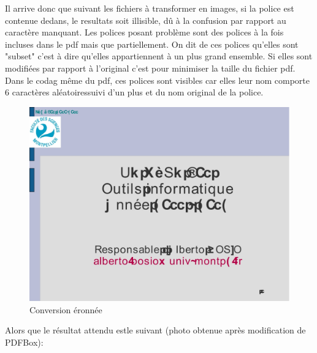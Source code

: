 Il arrive donc que suivant les fichiers à transformer en images, si la police 
est contenue dedans, le resultats soit illisible, dû à la confusion par rapport
au caractère manquant. 
Les polices posant problème sont des polices à la fois incluses dans le pdf mais que
partiellement. On dit de ces polices qu'elles sont "subset" c'est à dire qu'elles appartiennent
à un plus grand ensemble. Si elles sont modifiées par rapport à l'original c'est pour
minimiser la taille du fichier pdf. Dans le codag même du pdf, ces polices sont visibles 
car elles leur nom comporte 6 caractères aléatoiressuivi d'un plus et du nom original 
de la police.
    \begin{figure}[h]
        \begin{center}
            \includegraphics[scale=0.2]{images/GLSE301_2011-2012_seance_11_badConv.jpg} 
        \end{center}

        \caption{Conversion éronnée}
        \label{Conversion éronnée}
    \end{figure}


Alors que le résultat attendu estle suivant (photo obtenue après modification de
PDFBox):


